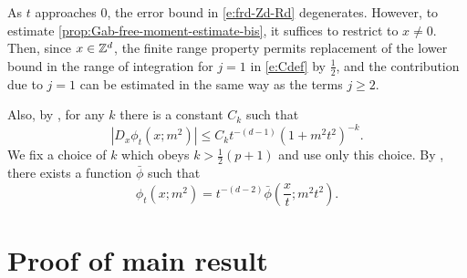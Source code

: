 As $t$ approaches $0$, the error bound in \eqref{e:frd-Zd-Rd} degenerates.
However, to estimate \eqref{prop:Gab-free-moment-estimate-bis}, it suffices to
restrict to $x \neq 0$.
Then, since $x \in {\mathbb Z}^d$, the finite range property permits replacement of the lower bound
in the range of integration for $j=1$ in \eqref{e:Cdef} by $\frac12$, and the contribution
due to $j=1$ can be estimated in the same way as the terms $j\geq 2$.

Also, by \cite[(1.34)]{Baue13a}, for any $k$ there is a constant $C_k$ such that
\begin{equation}
\label{e:frd-deriv-est}
|D_x \phi_t(x; m^2)| \leq C_k t^{-(d - 1)} (1 + m^2 t^2)^{-k}.
\end{equation}
We fix a choice of $k$ which obeys $k > \frac 12 (p+1)$ and use only this choice.
By \cite[(1.38)]{Baue13a}, there exists a function $\bar\phi$ such that
\begin{equation}
\label{e:frd-scaling}
\phi_t(x; m^2) = t^{-(d - 2)} \bar\phi\left(\frac{x}{t}; m^2 t^2\right).
\end{equation}


\section{Proof of main result}

